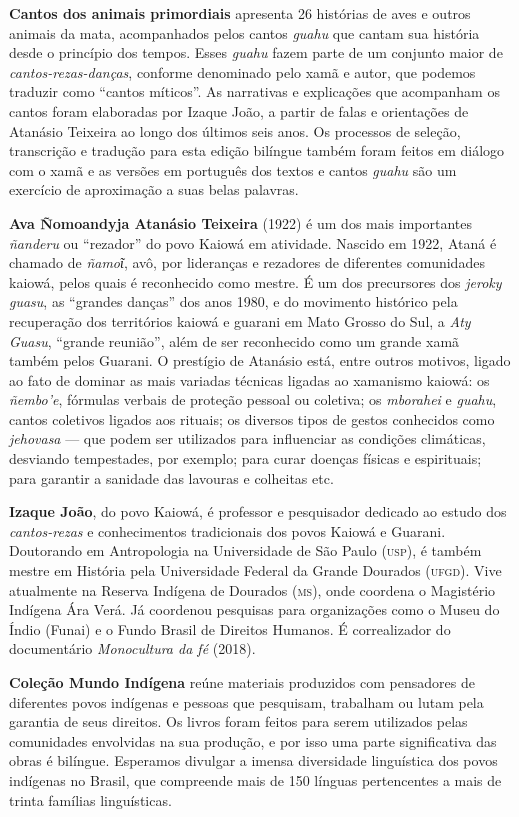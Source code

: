 \textbf{Cantos dos animais primordiais} apresenta 26 histórias de aves e outros animais da
mata, acompanhados pelos cantos \textit{guahu} que cantam sua história
desde o princípio dos tempos. Esses \textit{guahu} fazem parte de um
conjunto maior de \textit{cantos-rezas-danças}, conforme denominado pelo xamã e autor, que podemos traduzir como ``cantos míticos''. As
narrativas e explicações que acompanham os cantos foram elaboradas por
Izaque João, a partir de falas e orientações de Atanásio Teixeira ao
longo dos últimos seis anos. Os processos de seleção, transcrição e
tradução para esta edição bilíngue também foram feitos em diálogo com o
xamã e as versões em português dos textos e cantos \textit{guahu} são um
exercício de aproximação a suas belas palavras.

\textbf{Ava Ñomoandyja Atanásio Teixeira} (1922) é um dos mais importantes \textit{ñanderu} ou ``rezador'' do povo Kaiowá em atividade. Nascido em 1922, Ataná é chamado de \textit{ñamoῖ}, avô, por lideranças e rezadores de diferentes comunidades kaiowá, pelos quais é reconhecido como mestre. É um dos precursores dos \textit{jeroky guasu}, as ``grandes danças'' dos anos 1980, e do movimento histórico pela recuperação dos territórios kaiowá e guarani em Mato Grosso do Sul, a \textit{Aty Guasu}, ``grande reunião'', além de ser reconhecido como um grande xamã também pelos Guarani. O prestígio de Atanásio está, entre outros motivos, ligado ao fato de dominar as mais variadas técnicas ligadas ao xamanismo kaiowá: os \textit{ñembo'e}, fórmulas verbais de proteção pessoal ou coletiva; os \textit{mborahei} e \textit{guahu}, cantos coletivos ligados aos rituais; os diversos tipos de gestos conhecidos como \textit{jehovasa} --- que podem ser utilizados para influenciar as condições climáticas, desviando tempestades, por exemplo; para curar doenças físicas e espirituais; para garantir a sanidade das lavouras e colheitas etc.

\textbf{Izaque João}, do povo Kaiowá, é professor e pesquisador dedicado ao estudo dos \textit{cantos-rezas} e conhecimentos tradicionais dos povos Kaiowá e Guarani. Doutorando em
Antropologia na Universidade de São Paulo (\textsc{usp}), é também mestre em História pela
Universidade Federal da Grande Dourados (\textsc{ufgd}). Vive atualmente na Reserva
Indígena de Dourados (\textsc{ms}), onde coordena o Magistério Indígena Ára Verá. Já
coordenou pesquisas para organizações como o Museu do Índio (Funai) e o Fundo
Brasil de Direitos Humanos. É correalizador do documentário \textit{Monocultura da fé} (2018).

\textbf{Coleção Mundo Indígena} reúne materiais produzidos com pensadores de diferentes povos indígenas e pessoas que pesquisam, trabalham ou lutam pela garantia de seus direitos. Os livros foram feitos para serem utilizados pelas comunidades envolvidas na sua produção, e por isso uma parte significativa das obras é bilíngue. Esperamos divulgar a imensa diversidade linguística dos povos indígenas no Brasil, que compreende mais de 150 línguas pertencentes a mais de trinta famílias linguísticas.



